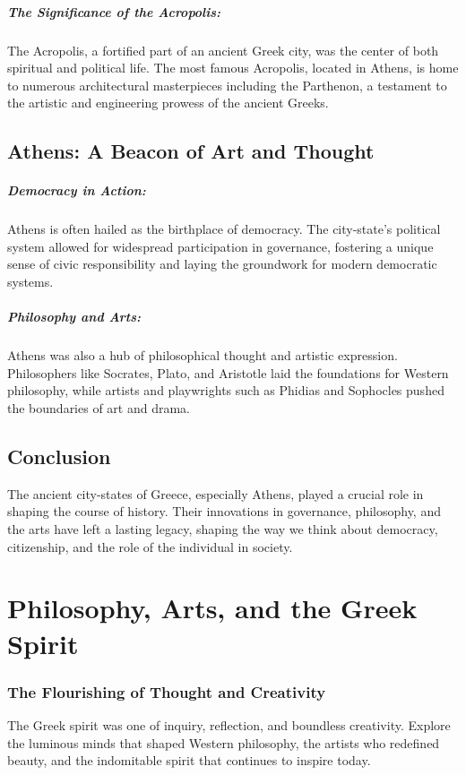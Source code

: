 \documentclass[a4paper,12pt]{book}
\begin{document}
\paragraph{The Significance of the Acropolis:}
The Acropolis, a fortified part of an ancient Greek city, was the center of both spiritual and political life. The most famous Acropolis, located in Athens, is home to numerous architectural masterpieces including the Parthenon, a testament to the artistic and engineering prowess of the ancient Greeks.

\section*{Athens: A Beacon of Art and Thought}

\paragraph{Democracy in Action:}
Athens is often hailed as the birthplace of democracy. The city-state’s political system allowed for widespread participation in governance, fostering a unique sense of civic responsibility and laying the groundwork for modern democratic systems.

\paragraph{Philosophy and Arts:}
Athens was also a hub of philosophical thought and artistic expression. Philosophers like Socrates, Plato, and Aristotle laid the foundations for Western philosophy, while artists and playwrights such as Phidias and Sophocles pushed the boundaries of art and drama.

\section*{Conclusion}

The ancient city-states of Greece, especially Athens, played a crucial role in shaping the course of history. Their innovations in governance, philosophy, and the arts have left a lasting legacy, shaping the way we think about democracy, citizenship, and the role of the individual in society.

\chapter{Philosophy, Arts, and the Greek Spirit}
\subsection*{The Flourishing of Thought and Creativity}
The Greek spirit was one of inquiry, reflection, and boundless creativity. Explore the luminous minds that shaped Western philosophy, the artists who redefined beauty, and the indomitable spirit that continues to inspire today.
\end{document}
